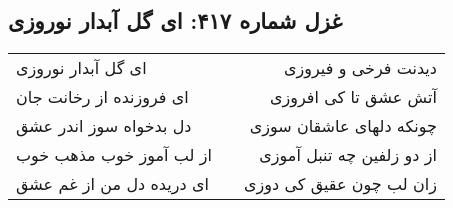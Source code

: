 \begin{center}
\section*{غزل شماره ۴۱۷: ای گل آبدار نوروزی}
\label{sec:417}
\begin{longtable}{l p{0.5cm} r}
ای گل آبدار نوروزی
&&
دیدنت فرخی و فیروزی
\\
ای فروزنده از رخانت جان
&&
آتش عشق تا کی افروزی
\\
دل بدخواه سوز اندر عشق
&&
چونکه دلهای عاشقان سوزی
\\
از لب آموز خوب مذهب خوب
&&
از دو زلفین چه تنبل آموزی
\\
ای دریده دل من از غم عشق
&&
زان لب چون عقیق کی دوزی
\\
\end{longtable}
\end{center}
